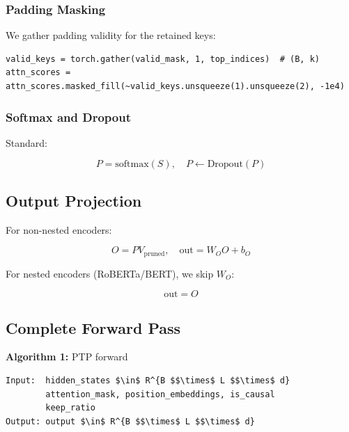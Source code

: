 {\subsubsection{Padding Masking}

We gather padding validity for the retained keys:

\begin{lstlisting}
valid_keys = torch.gather(valid_mask, 1, top_indices)  # (B, k)
attn_scores = attn_scores.masked_fill(~valid_keys.unsqueeze(1).unsqueeze(2), -1e4)
\end{lstlisting}

\subsubsection{Softmax and Dropout}

Standard:

\[
P = \text{softmax}(S), \quad P \leftarrow \text{Dropout}(P)
\tag{4.6}
\]

\subsection{Output Projection}

For non-nested encoders:

\[
O = P V_\text{pruned}, \quad \text{out} = W_O O + b_O
\tag{4.7}
\]

For nested encoders (RoBERTa/BERT), we skip $W_O$:

\[
\text{out} = O
\tag{4.8}
\]

\subsection{Complete Forward Pass}

\textbf{Algorithm 1:} PTP forward
\begin{lstlisting}
Input:  hidden_states $\in$ R^{B $$\times$ L $$\times$ d}
        attention_mask, position_embeddings, is_causal
        keep_ratio  
Output: output $\in$ R^{B $$\times$ L $$\times$ d}


\end{lstlisting}}
